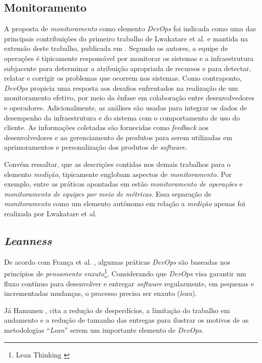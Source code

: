 \subsection{Monitoramento}

A proposta de \emph{monitoramento} como elemento \textit{DevOps} foi indicada
como uma das principais contribuições do primeiro trabalho de Lwakatare et al.
\cite{dimensions_of_devops} e mantida na extensão deste trabalho, publicada
em \cite{extending_dimensions}. Segundo os autores, a equipe de
operações é tipicamente responsável por monitorar os sistemas e a
infraestrutura subjacente para determinar a atribuição apropriada de recursos e
para detectar, relatar e corrigir os problemas que ocorrem nos sistemas.
Como contraponto, \textit{DevOps} propicia uma resposta aos desafios enfrentados na
realização de um monitoramento efetivo, por meio da ênfase em colaboração entre
desenvolvedores e operadores. Adicionalmente, as análises são usadas para
integrar os dados de desempenho da infraestrutura e do sistema com o
comportamento de uso do cliente. As informações coletadas são fornecidas como
\textit{feedback} aos desenvolvedores e ao gerenciamento de produtos para serem
utilizadas em aprimoramentos e personalização dos produtos de \textit{software}.

Convém ressaltar, que as descrições contidas nos demais trabalhos para o
elemento \emph{medição}, tipicamente englobam aspectos de \emph{monitoramento}.
Por exemplo, entre as práticas apontadas em \cite{characterizing_devops} estão
\emph{monitoramento de operações} e \emph{monitoramento de equipes por meio de
métricas}. Essa separação de \emph{monitoramento} como um elemento autônomo em
relação a \emph{medição} apenas foi realizada por Lwakatare et al.

\subsection{\textit{Leanness}}

De acordo com França et al. \cite{characterizing_devops}, algumas práticas
\textit{DevOps} são baseadas nos princípios de \emph{pensamento enxuto}\footnote{Lean
Thinking \cite{lean_thinking}}. Considerando que \textit{DevOps} visa garantir
um fluxo contínuo para desenvolver e entregar {\it software} regularmente, em
pequenas e incrementadas mudanças, o processo precisa ser enxuto (\textit{lean}).

Já Hamunen \cite{challenges_in_adopting_devops}, cita a redução de desperdícios,
a limitação do trabalho em andamento e a redução de tamanho das entregas para
ilustrar os motivos de as metodologias ``{\it Lean}'' serem um importante
elemento de {\it DevOps}.

